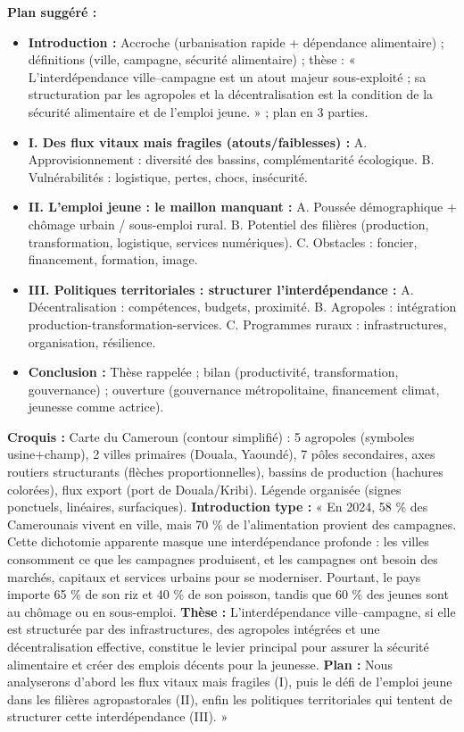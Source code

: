 \documentclass[11pt]{article}
\begin{document}
\begin{corrige}
\textbf{Plan suggéré :}
\begin{itemize}
\item \textbf{Introduction :} Accroche (urbanisation rapide + dépendance alimentaire) ; définitions (ville, campagne, sécurité alimentaire) ; thèse : « L'interdépendance ville–campagne est un atout majeur sous-exploité ; sa structuration par les agropoles et la décentralisation est la condition de la sécurité alimentaire et de l'emploi jeune. » ; plan en 3 parties.
\item \textbf{I. Des flux vitaux mais fragiles (atouts/faiblesses) :} A. Approvisionnement : diversité des bassins, complémentarité écologique. B. Vulnérabilités : logistique, pertes, chocs, insécurité.
\item \textbf{II. L'emploi jeune : le maillon manquant :} A. Poussée démographique + chômage urbain / sous-emploi rural. B. Potentiel des filières (production, transformation, logistique, services numériques). C. Obstacles : foncier, financement, formation, image.
\item \textbf{III. Politiques territoriales : structurer l'interdépendance :} A. Décentralisation : compétences, budgets, proximité. B. Agropoles : intégration production-transformation-services. C. Programmes ruraux : infrastructures, organisation, résilience.
\item \textbf{Conclusion :} Thèse rappelée ; bilan (productivité, transformation, gouvernance) ; ouverture (gouvernance métropolitaine, financement climat, jeunesse comme actrice).
\end{itemize}
\textbf{Croquis :} Carte du Cameroun (contour simplifié) : 5 agropoles (symboles usine+champ), 2 villes primaires (Douala, Yaoundé), 7 pôles secondaires, axes routiers structurants (flèches proportionnelles), bassins de production (hachures colorées), flux export (port de Douala/Kribi). Légende organisée (signes ponctuels, linéaires, surfaciques).
\textbf{Introduction type :} « En 2024, 58 \% des Camerounais vivent en ville, mais 70 \% de l'alimentation provient des campagnes. Cette dichotomie apparente masque une interdépendance profonde : les villes consomment ce que les campagnes produisent, et les campagnes ont besoin des marchés, capitaux et services urbains pour se moderniser. Pourtant, le pays importe 65 \% de son riz et 40 \% de son poisson, tandis que 60 \% des jeunes sont au chômage ou en sous-emploi. \textbf{Thèse :} L'interdépendance ville–campagne, si elle est structurée par des infrastructures, des agropoles intégrées et une décentralisation effective, constitue le levier principal pour assurer la sécurité alimentaire et créer des emplois décents pour la jeunesse. \textbf{Plan :} Nous analyserons d'abord les flux vitaux mais fragiles (I), puis le défi de l'emploi jeune dans les filières agropastorales (II), enfin les politiques territoriales qui tentent de structurer cette interdépendance (III). »

\end{corrige}
\end{document}
